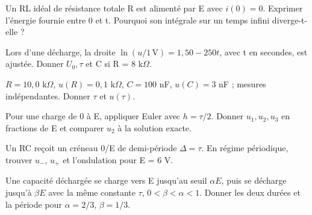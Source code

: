 \begin{questions}
\item Un RL idéal de résistance totale R est alimenté par E avec $i(0)=0$. Exprimer l’énergie fournie entre 0 et t. Pourquoi son intégrale sur un temps infini diverge-t-elle ?
\end{questions}



\begin{questions}
\item Lors d’une décharge, la droite $\ln(u/1\,\mathrm V)=1{,}50-250t$, avec t en secondes, est ajustée. Donner $U_0,\tau$ et C si R = 8 k$\Omega$.
\end{questions}

\begin{questions}
\item $R=10{,}0$ k$\Omega$, $u(R)=0{,}1$ k$\Omega$, $C=100$ nF, $u(C)=3$ nF ; mesures indépendantes. Donner $\tau$ et $u(\tau)$.
\end{questions}

\begin{questions}
\item Pour une charge de 0 à E, appliquer Euler avec $h=\tau/2$. Donner $u_1,u_2,u_3$ en fractions de E et comparer $u_2$ à la solution exacte.
\end{questions}



\begin{questions}
\item Un RC reçoit un créneau 0/E de demi-période $\Delta=\tau$. En régime périodique, trouver $u_-$, $u_+$ et l’ondulation pour E = 6 V.
\end{questions}

\begin{questions}
\item Une capacité déchargée se charge vers E jusqu’au seuil $\alpha E$, puis se décharge jusqu’à $\beta E$ avec la même constante $\tau$, $0<\beta<\alpha<1$. Donner les deux durées et la période pour $\alpha=2/3$, $\beta=1/3$.
\end{questions}

